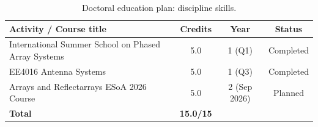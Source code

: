 \begin{table}[!ht]
    \centering
    \caption{Doctoral education plan: discipline skills.}
    \label{tab:discipline-skills}
    \small
    \begin{tabularx}{\textwidth}{Xccc}
        \toprule
        \textbf{Activity / Course title} & \textbf{Credits} & \textbf{Year} & \textbf{Status} \\
        \midrule
        International Summer School on Phased Array Systems & 5.0 & 1 (Q1) & Completed \\
        EE4016 \textbar{} Antenna Systems & 5.0 & 1 (Q3) & Completed \\
        Arrays and Reflectarrays \textbar{} ESoA 2026 Course & 5.0 & 2 (Sep 2026) & Planned \\
        \midrule
        \textbf{Total} & \textbf{15.0/15} & & \\
        \bottomrule
    \end{tabularx}
\end{table}
